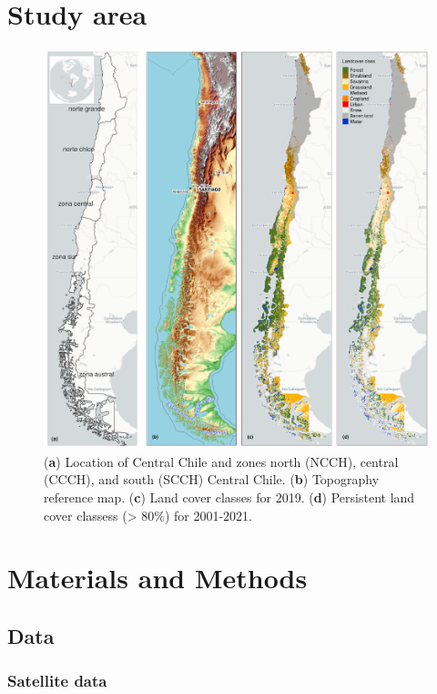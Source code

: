 \documentclass[preprint,
3p]{elsarticle} %
\begin{document}
\hypertarget{study-area}{%
\section{Study area}\label{study-area}}

\begin{figure}[!ht]
\centering
\includegraphics[width=\textwidth]{../output/figs/map_study_con_landcover.png}
\caption{ (\textbf{a}) Location of Central Chile and zones north (NCCH), central (CCCH), and south (SCCH) Central Chile. (\textbf{b}) Topography reference map. (\textbf{c}) Land cover classes for 2019. (\textbf{d}) Persistent land cover classess (> 80\%) for 2001-2021.}
\end{figure}

\hypertarget{materials-and-methods}{%
\section{Materials and Methods}\label{materials-and-methods}}

\hypertarget{data}{%
\subsection{Data}\label{data}}

\hypertarget{satellite-data}{%
\subsubsection{Satellite data}\label{satellite-data}}
\end{document}
